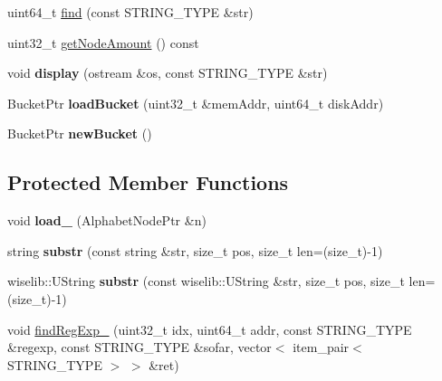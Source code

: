 \begin{CompactItemize}
\item 
uint64\_\-t \hyperlink{classBTrie_3c466397db53b56baa0def869f49a1f3}{find} (const STRING\_\-TYPE \&str)
\item 
uint32\_\-t \hyperlink{classBTrie_71cd037bb6ec881966cc91264377e35e}{getNodeAmount} () const 
\item 
\hypertarget{classBTrie_a31346d8cf5b9ffbf00873b726cb04db}{
void \textbf{display} (ostream \&os, const STRING\_\-TYPE \&str)}
\label{classBTrie_a31346d8cf5b9ffbf00873b726cb04db}

\item 
\hypertarget{classBTrie_6004a5f648926b28e5cd4820756aae45}{
BucketPtr \textbf{loadBucket} (uint32\_\-t \&memAddr, uint64\_\-t diskAddr)}
\label{classBTrie_6004a5f648926b28e5cd4820756aae45}

\item 
\hypertarget{classBTrie_67416e8012c149630658da525533b0c2}{
BucketPtr \textbf{newBucket} ()}
\label{classBTrie_67416e8012c149630658da525533b0c2}

\end{CompactItemize}
\subsection*{Protected Member Functions}
\begin{CompactItemize}
\item 
\hypertarget{classBTrie_8a979fa156b124ba6fa442cc1190ad35}{
void \textbf{load\_\-} (AlphabetNodePtr \&n)}
\label{classBTrie_8a979fa156b124ba6fa442cc1190ad35}

\item 
\hypertarget{classBTrie_d518bfc4264e615479c9afcf0d313954}{
string \textbf{substr} (const string \&str, size\_\-t pos, size\_\-t len=(size\_\-t)-1)}
\label{classBTrie_d518bfc4264e615479c9afcf0d313954}

\item 
\hypertarget{classBTrie_ca2c65640ed76ddd91025bd86b832f97}{
wiselib::UString \textbf{substr} (const wiselib::UString \&str, size\_\-t pos, size\_\-t len=(size\_\-t)-1)}
\label{classBTrie_ca2c65640ed76ddd91025bd86b832f97}

\item 
void \hyperlink{classBTrie_3125cac8b6ba87306a3636bddd0da0f3}{findRegExp\_\-} (uint32\_\-t idx, uint64\_\-t addr, const STRING\_\-TYPE \&regexp, const STRING\_\-TYPE \&sofar, vector$<$ item\_\-pair$<$ STRING\_\-TYPE $>$ $>$ \&ret)
\end{CompactItemize}

